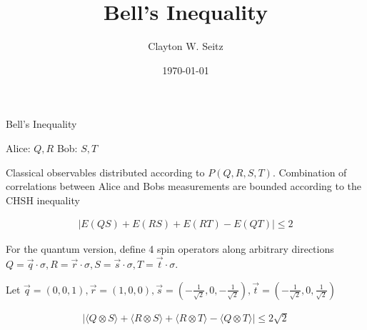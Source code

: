 \documentclass[aspectratio=1610]{beamer}					%
\title{Bell's Inequality}	%
\author{Clayton W. Seitz}								%
\date{\today}									%
\begin{document}
\begin{frame}
  \titlepage
\end{frame}

\begin{frame}{Bell's Inequality}

\vspace{0.2in}

Alice: $Q,R$
Bob: $S, T$

\vspace{0.1in}
Classical observables distributed according to $P(Q,R,S,T)$. Combination of correlations between Alice and Bobs measurements are bounded according to the CHSH inequality

\begin{align*}
|E(QS) + E(RS) + E(RT) - E(QT)| \leq 2
\end{align*}

For the quantum version, define 4 spin operators along arbitrary directions $Q = \vec{q}\cdot\sigma, R = \vec{r}\cdot\sigma, S = \vec{s}\cdot\sigma, T = \vec{t}\cdot\sigma$.

Let $\vec{q} = (0,0,1), \vec{r} = (1,0,0), \vec{s} = (-\frac{1}{\sqrt{2}},0,-\frac{1}{\sqrt{2}}), \vec{t} = (-\frac{1}{\sqrt{2}},0,\frac{1}{\sqrt{2}})$

\begin{align*}
|\langle Q\otimes S\rangle + \langle R\otimes S\rangle  + \langle R\otimes T\rangle  - \langle Q\otimes T\rangle|  \leq 2\sqrt{2}
\end{align*}



\end{frame}
\end{document}
